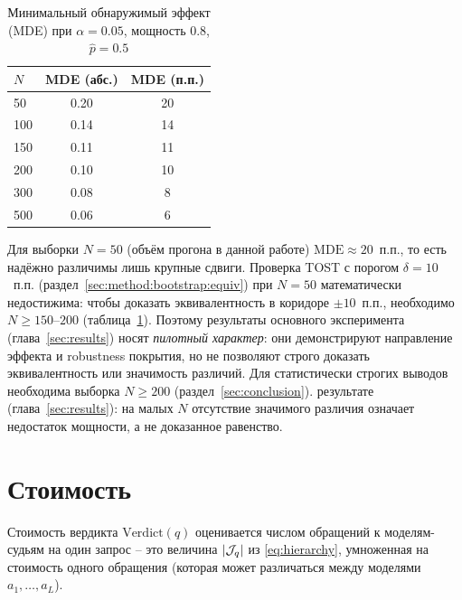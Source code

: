\begin{table}[htbp]
    \centering
    \caption{Минимальный обнаружимый эффект (MDE) при $\alpha = 0.05$,
    мощность $0.8$, $\hat{p} = 0.5$}
    \label{tab:mde}
    \begin{tabular}{lcc}
        \toprule
        $N$ & MDE (абс.) & MDE (п.п.) \\
        \midrule
        50 & 0.20 & 20 \\
        100 & 0.14 & 14 \\
        150 & 0.11 & 11 \\
        200 & 0.10 & 10 \\
        300 & 0.08 & 8 \\
        500 & 0.06 & 6 \\
        \bottomrule
    \end{tabular}
\end{table}

Для выборки $N = 50$ (объём прогона в данной работе)
$\mathrm{MDE} \approx 20$~п.п., то есть надёжно различимы лишь крупные
сдвиги.
Проверка TOST с порогом $\delta = 10$~п.п. (раздел~\ref{sec:method:bootstrap:equiv})
при $N = 50$ математически недостижима: чтобы доказать эквивалентность
в коридоре $\pm 10$~п.п., необходимо $N \ge 150$--$200$
(таблица~\ref{tab:mde}).
Поэтому результаты основного эксперимента (глава~\ref{sec:results}) носят
\emph{пилотный характер}: они демонстрируют направление эффекта и
robustness покрытия, но не позволяют строго доказать эквивалентность
или значимость различий.
Для статистически строгих выводов необходима выборка $N \ge 200$
(раздел~\ref{sec:conclusion}).
результате (глава~\ref{sec:results}): на малых $N$ отсутствие значимого
различия означает недостаток мощности, а не доказанное равенство.

\section{Стоимость}
\label{sec:experiments:cost}

Стоимость вердикта $\mathrm{Verdict}(q)$ оценивается числом обращений к
моделям-судьям на один запрос -- это величина $\left\lvert\mathcal{J}_q\right\rvert$ из
\eqref{eq:hierarchy}, умноженная на стоимость одного обращения (которая
может различаться между моделями $a_1, \dots, a_L$).

